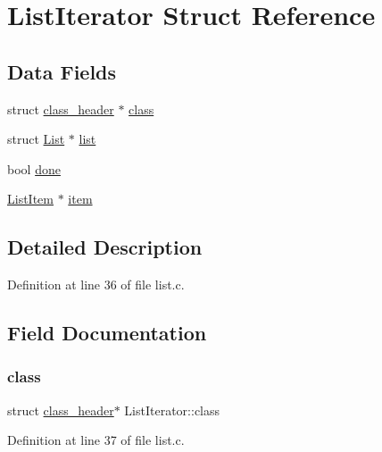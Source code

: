 \hypertarget{structListIterator}{}\section{List\+Iterator Struct Reference}
\label{structListIterator}
\subsection*{Data Fields}
\begin{DoxyCompactItemize}
\item 
struct \mbox{\hyperlink{structclass__header}{class\+\_\+header}} $\ast$ \mbox{\hyperlink{structListIterator_ab3502d78f7274e2ececbc7581bedff74}{class}}
\item 
struct \mbox{\hyperlink{structList}{List}} $\ast$ \mbox{\hyperlink{structListIterator_a6f7c700353a4ce4a687504ba0a0b35e0}{list}}
\item 
bool \mbox{\hyperlink{structListIterator_a63d062a738f1a9278cb996d8d6abc262}{done}}
\item 
\mbox{\hyperlink{structListItem}{List\+Item}} $\ast$ \mbox{\hyperlink{structListIterator_a4be321bdc175ecfa3bc9e74e107e8fdd}{item}}
\end{DoxyCompactItemize}


\subsection{Detailed Description}


Definition at line 36 of file list.\+c.



\subsection{Field Documentation}
\mbox{\label{structListIterator_ab3502d78f7274e2ececbc7581bedff74}} 
\subsubsection{\texorpdfstring{class}{class}}
{\footnotesize\ttfamily struct \mbox{\hyperlink{structclass__header}{class\+\_\+header}}$\ast$ List\+Iterator\+::class}



Definition at line 37 of file list.\+c.



